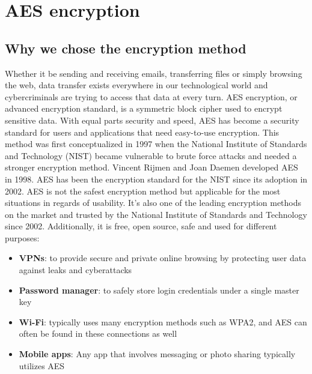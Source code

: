 \documentclass[]{article}
\begin{document}
\section{AES encryption}
\subsection{Why we chose the encryption method}
Whether it be sending and receiving emails, transferring files or simply browsing the web, data transfer exists 
everywhere in our technological world and cybercriminals are trying to access that data at every turn.
AES encryption, or advanced encryption standard, is a symmetric block cipher used to encrypt sensitive data.
With equal parts security and speed, AES has become a security standard for users and applications that need 
easy-to-use encryption. This method was first conceptualized in 1997 when the National Institute of Standards and 
Technology (NIST) became vulnerable to brute force attacks and needed a stronger encryption method.
Vincent Rijmen and Joan Daemen developed AES in 1998. AES has been the encryption standard for the NIST since its 
adoption in 2002. 
AES is not the safest encryption method but applicable for the most situations in regards of usability. It's also
one of the leading encryption methods on the market and trusted by the National Institute of Standards and Technology 
since 2002. Additionally, it is free, open source, safe and used for different purposes: \cite{panda}
\begin{itemize}
    \item \textbf{VPNs}: to provide secure and private online browsing by protecting user data against leaks and cyberattacks
    \item \textbf{Password manager}: to safely store login credentials under a single master key
    \item \textbf{Wi-Fi}: typically uses many encryption methods such as WPA2, and AES can often be found in these connections as well
    \item \textbf{Mobile apps}: Any app that involves messaging or photo sharing typically utilizes AES
\end{itemize}
\end{document}
